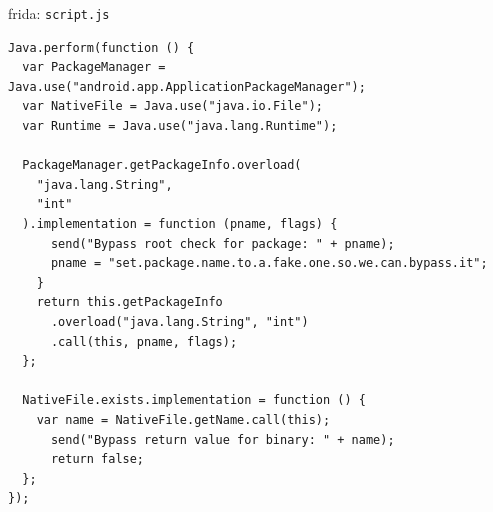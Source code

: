 \documentclass{beamer}
\begin{document}
\begin{frame}[fragile]{frida: \texttt{script.js}}
    \begin{verbatim}
Java.perform(function () {
  var PackageManager = Java.use("android.app.ApplicationPackageManager");
  var NativeFile = Java.use("java.io.File");
  var Runtime = Java.use("java.lang.Runtime");

  PackageManager.getPackageInfo.overload(
    "java.lang.String",
    "int"
  ).implementation = function (pname, flags) {
      send("Bypass root check for package: " + pname);
      pname = "set.package.name.to.a.fake.one.so.we.can.bypass.it";
    }
    return this.getPackageInfo
      .overload("java.lang.String", "int")
      .call(this, pname, flags);
  };

  NativeFile.exists.implementation = function () {
    var name = NativeFile.getName.call(this);
      send("Bypass return value for binary: " + name);
      return false;
  };
});

\end{verbatim}


\end{frame}
\end{document}

